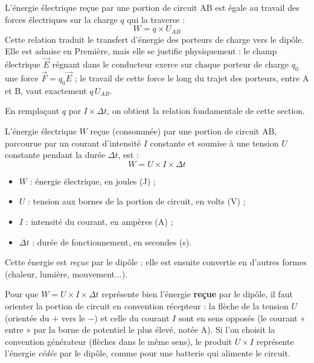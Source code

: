 \documentclass[11pt]{article}
\newcommand{\cle}[1]{{\popxbold\color{popdark}#1}}
\begin{document}
\begin{propriete}
L'énergie électrique reçue par une portion de circuit AB est égale au travail des forces électriques sur la charge $q$ qui la traverse :
\[ W = q \times U_{AB} \]
Cette relation traduit le transfert d'énergie des porteurs de charge vers le dipôle. Elle est admise en Première, mais elle se justifie physiquement : le champ électrique $\vec{E}$ régnant dans le conducteur exerce sur chaque porteur de charge $q_0$ une force $\vec{F} = q_0 \vec{E}$ ; le travail de cette force le long du trajet des porteurs, entre A et B, vaut exactement $q\,U_{AB}$.
\end{propriete}

En remplaçant $q$ par $I \times \Delta t$, on obtient la relation fondamentale de cette section.

\begin{definition}
L'\cle{énergie électrique} $W$ reçue (consommée) par une portion de circuit AB, parcourue par un courant d'intensité $I$ constante et soumise à une tension $U$ constante pendant la durée $\Delta t$, est :
\[ \boxed{W = U \times I \times \Delta t} \]
\begin{itemize}
\item $W$ : énergie électrique, en joules (J) ;
\item $U$ : tension aux bornes de la portion de circuit, en volts (V) ;
\item $I$ : intensité du courant, en ampères (A) ;
\item $\Delta t$ : durée de fonctionnement, en secondes (s).
\end{itemize}
Cette énergie est \emph{reçue} par le dipôle : elle est ensuite convertie en d'autres formes (chaleur, lumière, mouvement...).
\end{definition}

\begin{attention}
Pour que $W = U \times I \times \Delta t$ représente bien l'énergie \textbf{reçue} par le dipôle, il faut orienter la portion de circuit en \cle{convention récepteur} : la flèche de la tension $U$ (orientée du $+$ vers le $-$) et celle du courant $I$ sont en sens opposés (le courant « entre » par la borne de potentiel le plus élevé, notée A). Si l'on choisit la convention générateur (flèches dans le même sens), le produit $U \times I$ représente l'énergie \emph{cédée} par le dipôle, comme pour une batterie qui alimente le circuit.
\end{attention}
\end{document}
